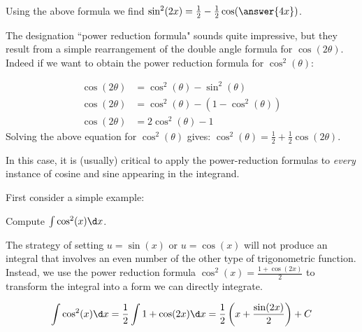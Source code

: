 \documentclass{ximera}
\begin{document}
\begin{question}
Using the above formula we find $\sin^2(2x) = \frac{1}{2}-\frac{1}{2} \cos(\answer{4x})$.
\end{question}

\begin{remark}
The designation ``power reduction formula" sounds quite impressive, but they result from a simple rearrangement of the double angle formula for $\cos(2\theta)$.  Indeed if we want to obtain the power reduction formula for $\cos^2(\theta)$:

\begin{align*}
\cos(2\theta) &= \cos^2(\theta)-\sin^2(\theta) \\
\cos(2\theta) &= \cos^2(\theta) - (1-\cos^2(\theta)) \\
\cos(2\theta) &= 2\cos^2(\theta)-1
\end{align*}
Solving the above equation for $\cos^2(\theta)$ gives: $\cos^2(\theta) = \frac{1}{2} +\frac{1}{2} \cos(2\theta)$.
\end{remark}

In this case, it is (usually) critical to apply the power-reduction
formulas to \textit{every} instance of cosine and sine appearing in
the integrand.

First consider a simple example:

\begin{example}
Compute $\int \cos^{2}(x) \d x$.

\begin{explanation}
The strategy of setting $u=\sin(x)$ or $u=\cos(x)$ will not produce an integral that involves an even number of the other type of trigonometric function.  Instead, we use the power reduction formula $\cos^{2}(x)=\frac{1+\cos(2x)}{2}$ to transform the integral into a form we can directly integrate.

\[
\int \cos^{2} (x) \d x= \frac{1}{2} \int 1+\cos(2x) \d x = \frac{1}{2} \left( x+ \frac{ \sin(2x)}{2} \right) + C
\]


\end{explanation}
\end{example}
\end{document}
